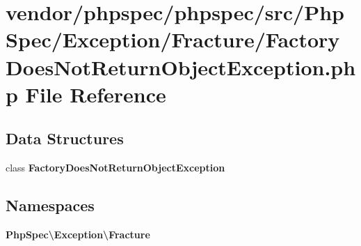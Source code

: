 \section{vendor/phpspec/phpspec/src/\+Php\+Spec/\+Exception/\+Fracture/\+Factory\+Does\+Not\+Return\+Object\+Exception.php File Reference}
\label{_factory_does_not_return_object_exception_8php}
\subsection*{Data Structures}
\begin{DoxyCompactItemize}
\item 
class {\bf Factory\+Does\+Not\+Return\+Object\+Exception}
\end{DoxyCompactItemize}
\subsection*{Namespaces}
\begin{DoxyCompactItemize}
\item 
 {\bf Php\+Spec\textbackslash{}\+Exception\textbackslash{}\+Fracture}
\end{DoxyCompactItemize}

